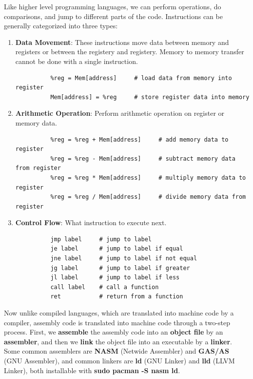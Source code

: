 \documentclass{article}
\begin{document}
    Like higher level programming languages, we can perform operations, do comparisons, and jump to different parts of the code. Instructions can be generally categorized into three types: 
    \begin{enumerate} 
      \item \textbf{Data Movement}: These instructions move data between memory and registers or between the registery and registery. Memory to memory transfer cannot be done with a single instruction. 
        \begin{lstlisting} 
          %reg = Mem[address]     # load data from memory into register
          Mem[address] = %reg     # store register data into memory
        \end{lstlisting}
      \item \textbf{Arithmetic Operation}: Perform arithmetic operation on register or memory data. 
        \begin{lstlisting} 
          %reg = %reg + Mem[address]     # add memory data to register
          %reg = %reg - Mem[address]     # subtract memory data from register
          %reg = %reg * Mem[address]     # multiply memory data to register
          %reg = %reg / Mem[address]     # divide memory data from register
        \end{lstlisting}
      \item \textbf{Control Flow}: What instruction to execute next. 
        \begin{lstlisting} 
          jmp label     # jump to label
          je label      # jump to label if equal
          jne label     # jump to label if not equal
          jg label      # jump to label if greater
          jl label      # jump to label if less
          call label    # call a function
          ret           # return from a function
        \end{lstlisting}
    \end{enumerate}

    Now unlike compiled languages, which are translated into machine code by a compiler, assembly code is translated into machine code through a two-step process. First, we \textbf{assemble} the assembly code into an \textbf{object file} by an \textbf{assembler}, and then we \textbf{link} the object file into an executable by a \textbf{linker}. Some common assemblers are \textbf{NASM} (Netwide Assembler) and \textbf{GAS/AS} (GNU Assembler), and common linkers are \textbf{ld} (GNU Linker) and \textbf{lld} (LLVM Linker), both installable with \textbf{sudo pacman -S nasm ld}. 
\end{document}
